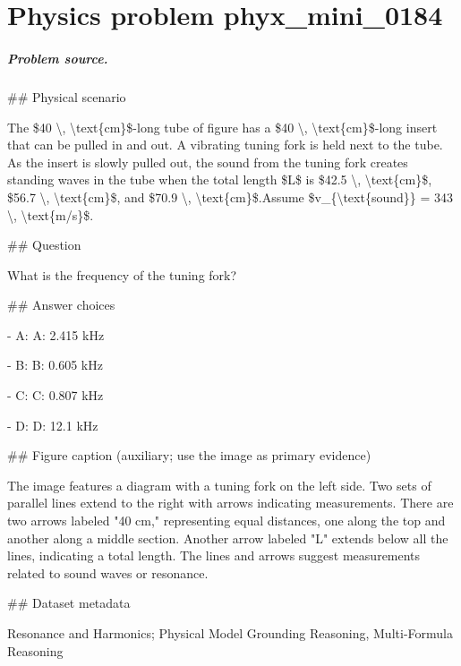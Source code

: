 
\chapter{Physics problem phyx\_mini\_0184}
\label{ch:PhyXMiniProblems_problem_phyx_mini_0184}

\paragraph{Problem source.}
\#\# Physical scenario

The \$40 \textbackslash{}, \textbackslash{}text\{cm\}\$-long tube of figure has a \$40 \textbackslash{}, \textbackslash{}text\{cm\}\$-long insert that can be pulled in and out. A vibrating tuning fork is held next to the tube. As the insert is slowly pulled out, the sound from the tuning fork creates standing waves in the tube when the total length \$L\$ is \$42.5 \textbackslash{}, \textbackslash{}text\{cm\}\$, \$56.7 \textbackslash{}, \textbackslash{}text\{cm\}\$, and \$70.9 \textbackslash{}, \textbackslash{}text\{cm\}\$.Assume \$v\_\{\textbackslash{}text\{sound\}\} = 343 \textbackslash{}, \textbackslash{}text\{m/s\}\$.

\#\# Question

What is the frequency of the tuning fork?

\#\# Answer choices

- A: A: 2.415 kHz

- B: B: 0.605 kHz

- C: C: 0.807 kHz

- D: D: 12.1 kHz

\#\# Figure caption (auxiliary; use the image as primary evidence)

The image features a diagram with a tuning fork on the left side. Two sets of parallel lines extend to the right with arrows indicating measurements. There are two arrows labeled "40 cm," representing equal distances, one along the top and another along a middle section. Another arrow labeled "L" extends below all the lines, indicating a total length. The lines and arrows suggest measurements related to sound waves or resonance.

\#\# Dataset metadata

Resonance and Harmonics; Physical Model Grounding Reasoning, Multi-Formula Reasoning

